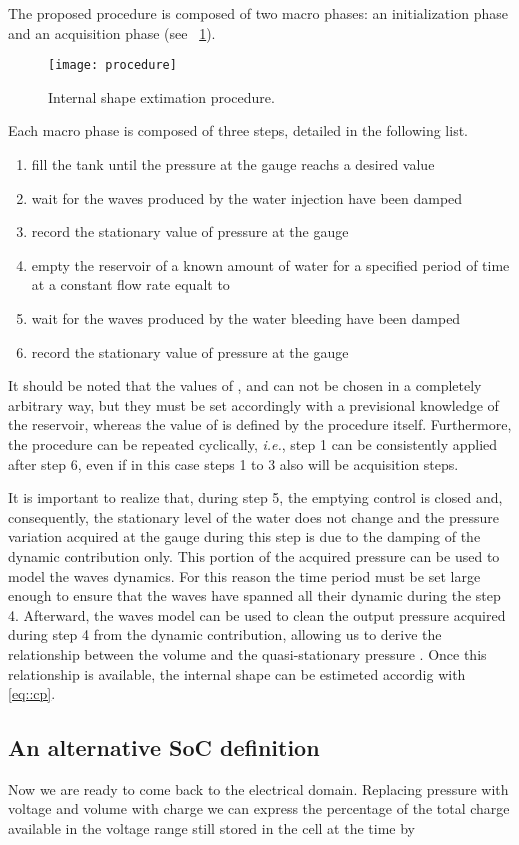 \documentclass[journal]{IEEEtran}
\begin{document}
The proposed procedure is composed of two macro phases: an initialization phase and an acquisition phase (see \figurename~\ref{fig::procedure}). 
\begin{figure}[!htbp]
	\centering
		\texttt{[image: procedure]}
	\caption{Internal shape extimation procedure.}
	\label{fig::procedure}
\end{figure}
Each macro phase is composed of three steps, detailed in the following list.
\begin{enumerate}
\item[step 1] fill the tank until the pressure at the gauge reachs a desired value
\item[step 2] wait for the waves produced by the water injection have been damped
\item[step 3] record the stationary value of pressure  at the gauge
\item[step 4] empty the reservoir of a known amount of water   for a specified period of time  at a constant flow rate equalt to 
\item[step 5] wait for the waves produced by the water bleeding have been damped
\item[step 6] record the stationary value of pressure  at the gauge
\end{enumerate}
It should be noted that the values of ,  and  can not be chosen in a completely arbitrary way, but they must be set accordingly with a previsional knowledge of the reservoir, whereas the value of  is defined by the procedure itself. 
Furthermore, the procedure can be repeated cyclically, \textit{i.e.}, step 1 can be consistently applied after step 6, even if in this case steps 1 to 3 also will be acquisition steps.

It is important to realize that, during step 5, the emptying control is closed and, consequently, the stationary level of the water does not change and the pressure variation acquired at the gauge during this step is due to the damping of the dynamic contribution only. 
This portion of the acquired pressure can be used to model the waves dynamics. For this reason the time period  must be set large enough to ensure that the waves have spanned all their dynamic during the step 4.
Afterward, the waves model can be used to clean the output pressure  acquired during step 4 from the dynamic contribution, allowing us to derive the relationship between the volume  and the quasi-stationary pressure .
Once this relationship is available, the internal shape  can be estimeted accordig with \eqref{eq::cp}.
\subsection{An alternative SoC definition}
Now we are ready to come back to the electrical domain. Replacing pressure with voltage and volume with charge we can express the percentage of the total charge  available in the voltage range  still stored in the cell at the time  by
\end{document}
